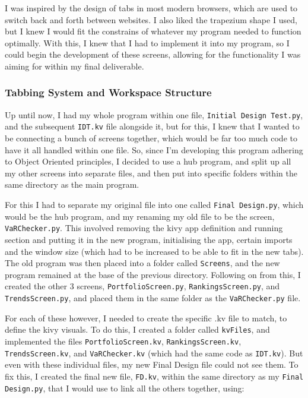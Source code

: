\documentclass{article}
\begin{document}
I was inspired by the design of tabs in most modern browsers, which are used to switch back and forth between websites. I also liked the trapezium shape I used, but I knew I would fit the constrains of whatever my program needed to function optimally. With this, I knew that I had to implement it into my program, so I could begin the development of these screens, allowing for the functionality I was aiming for within my final deliverable.\\\vspace{0.3cm}

\subsubsection{Tabbing System and Workspace Structure}
Up until now, I had my whole program within one file, \texttt{Initial Design Test.py}, and the subsequent \texttt{IDT.kv} file alongside it, but for this, I knew that I wanted to be connecting a bunch of screens together, which would be far too much code to have it all handled within one file. So, since I'm developing this program adhering to Object Oriented principles, I decided to use a hub program, and split up all my other screens into separate files, and then put into specific folders within the same directory as the main program.\\\vspace{0.3cm}

For this I had to separate my original file into one called \texttt{Final Design.py}, which would be the hub program, and my renaming my old file to be the screen, \texttt{VaRChecker.py}. This involved removing the kivy app definition and running section and putting it in the new program, initialising the app, certain imports and the window size (which had to be increased to be able to fit in the new tabs). The old program was then placed into a folder called \texttt{Screens}, and the new program remained at the base of the previous directory. Following on from this, I created the other 3 screens, \texttt{PortfolioScreen.py}, \texttt{RankingsScreen.py}, and \texttt{TrendsScreen.py}, and placed them in the same folder as the \texttt{VaRChecker.py} file.\\\vspace{0.3cm}

For each of these however, I needed to create the specific .kv file to match, to define the kivy visuals. To do this, I created a folder called \texttt{kvFiles}, and implemented the files \texttt{PortfolioScreen.kv}, \texttt{RankingsScreen.kv}, \texttt{TrendsScreen.kv}, and \texttt{VaRChecker.kv} (which had the same code as \texttt{IDT.kv}). But even with these individual files, my new Final Design file could not see them. To fix this, I created the final new file, \texttt{FD.kv}, within the same directory as my \texttt{Final Design.py}, that I would use to link all the others together, using: \\\vspace{0.3cm}
\end{document}
